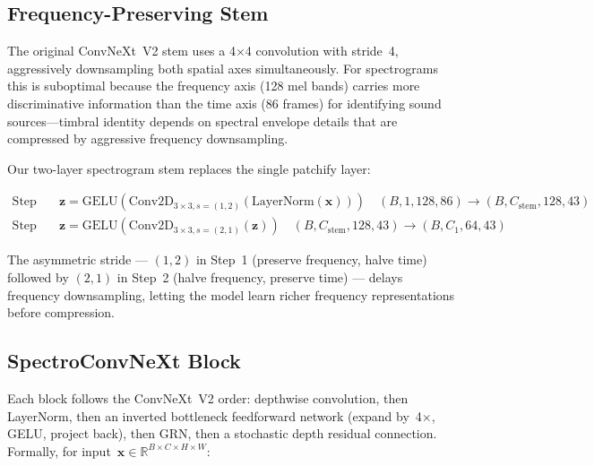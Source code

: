 \documentclass{article}
\begin{document}
\subsection{Frequency-Preserving Stem}

The original ConvNeXt~V2 stem uses a 4$\times$4 convolution with stride~4,
aggressively downsampling both spatial axes simultaneously. For spectrograms
this is suboptimal because the frequency axis (128 mel bands) carries more
discriminative information than the time axis (86 frames) for identifying sound
sources---timbral identity depends on spectral envelope details that are
compressed by aggressive frequency downsampling.

Our two-layer spectrogram stem replaces the single patchify layer:

\begin{align}
  \text{Step 1:}&\quad \mathbf{z} = \text{GELU}(\text{Conv2D}_{3\times3, s=(1,2)}(\text{LayerNorm}(\mathbf{x}))) \quad
  (B, 1, 128, 86) \rightarrow (B, C_{\text{stem}}, 128, 43) \label{eq:stem1}\\
  \text{Step 2:}&\quad \mathbf{z} = \text{GELU}(\text{Conv2D}_{3\times3, s=(2,1)}( \mathbf{z})) \quad
  (B, C_{\text{stem}}, 128, 43) \rightarrow (B, C_1, 64, 43) \label{eq:stem2}
\end{align}

The asymmetric stride --- $(1,2)$ in Step~1 (preserve frequency, halve time)
followed by $(2,1)$ in Step~2 (halve frequency, preserve time) --- delays
frequency downsampling, letting the model learn richer frequency representations
before compression.

\subsection{SpectroConvNeXt Block}

Each block follows the ConvNeXt~V2 order: depthwise convolution, then LayerNorm,
then an inverted bottleneck feedforward network (expand by~4$\times$, GELU,
project back), then GRN, then a stochastic depth residual connection. Formally,
for input~$\mathbf{x} \in \mathbb{R}^{B \times C \times H \times W}$:
\end{document}

